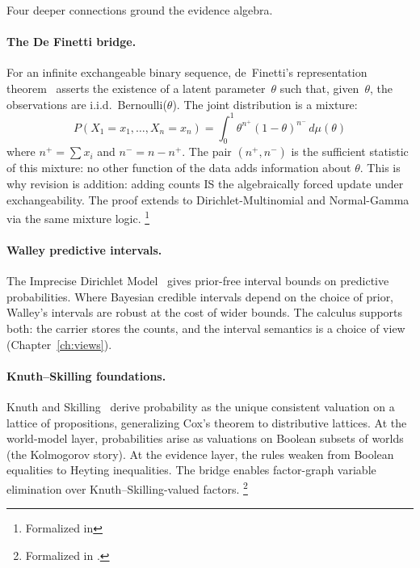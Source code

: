 \documentclass[11pt,openany]{report}
\begin{document}
Four deeper connections ground the evidence algebra.

\paragraph{The De Finetti bridge.}
For an infinite exchangeable binary sequence, de~Finetti's
representation theorem~\cite{definetti1937} asserts the existence of a
latent parameter~$\theta$ such that, given~$\theta$, the observations
are i.i.d.\ Bernoulli($\theta$).  The joint distribution is a mixture:
\[
  P(X_1 = x_1, \ldots, X_n = x_n)
  = \int_0^1 \theta^{n^+}(1 - \theta)^{n^-} \, d\mu(\theta)
\]
where $n^+ = \sum x_i$ and $n^- = n - n^+$.  The pair $(n^+, n^-)$
is the sufficient statistic of this mixture: no other function of
the data adds information about $\theta$.  This is why revision is
addition: adding counts IS the algebraically forced update under
exchangeability.  The proof extends to Dirichlet-Multinomial and
Normal-Gamma via the same mixture logic.%
\footnote{Formalized in
}

\paragraph{Walley predictive intervals.}
The Imprecise Dirichlet Model~\cite{Walley1996BagOfMarbles} gives
prior-free interval bounds on predictive probabilities.  Where
Bayesian credible intervals depend on the choice of prior, Walley's
intervals are robust at the cost of wider bounds.  The calculus
supports both: the carrier stores the counts, and the interval
semantics is a choice of view (Chapter~\ref{ch:views}).

\paragraph{Knuth--Skilling foundations.}
Knuth and Skilling~\cite{KnuthSkilling2012} derive probability as
the unique consistent valuation on a lattice of propositions,
generalizing Cox's theorem to distributive lattices.  At the
world-model layer, probabilities arise as valuations on Boolean
subsets of worlds (the Kolmogorov story).  At the evidence layer, the
rules weaken from Boolean equalities to Heyting inequalities.  The
bridge enables factor-graph variable elimination over
Knuth--Skilling-valued factors.%
\footnote{Formalized in
.}
\end{document}
